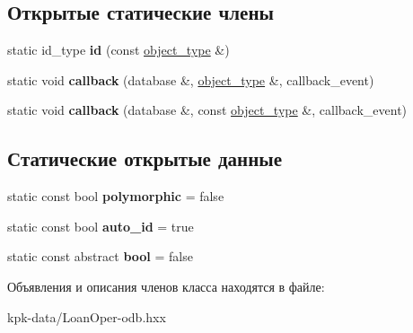 \subsection*{Открытые статические члены}
\begin{DoxyCompactItemize}
\item 
static id\+\_\+type {\bfseries id} (const \hyperlink{classkpk_1_1data_1_1_loan_oper}{object\+\_\+type} \&)\hypertarget{classodb_1_1access_1_1object__traits_3_01_1_1kpk_1_1data_1_1_loan_oper_01_4_a74978df585d0439b087c99bee90d77a3}{}\label{classodb_1_1access_1_1object__traits_3_01_1_1kpk_1_1data_1_1_loan_oper_01_4_a74978df585d0439b087c99bee90d77a3}

\item 
static void {\bfseries callback} (database \&, \hyperlink{classkpk_1_1data_1_1_loan_oper}{object\+\_\+type} \&, callback\+\_\+event)\hypertarget{classodb_1_1access_1_1object__traits_3_01_1_1kpk_1_1data_1_1_loan_oper_01_4_ac09fa22eac3b4ea186a24aca23d68391}{}\label{classodb_1_1access_1_1object__traits_3_01_1_1kpk_1_1data_1_1_loan_oper_01_4_ac09fa22eac3b4ea186a24aca23d68391}

\item 
static void {\bfseries callback} (database \&, const \hyperlink{classkpk_1_1data_1_1_loan_oper}{object\+\_\+type} \&, callback\+\_\+event)\hypertarget{classodb_1_1access_1_1object__traits_3_01_1_1kpk_1_1data_1_1_loan_oper_01_4_afff5db5a1b10413fd5d7a792573d3d17}{}\label{classodb_1_1access_1_1object__traits_3_01_1_1kpk_1_1data_1_1_loan_oper_01_4_afff5db5a1b10413fd5d7a792573d3d17}

\end{DoxyCompactItemize}
\subsection*{Статические открытые данные}
\begin{DoxyCompactItemize}
\item 
static const bool {\bfseries polymorphic} = false\hypertarget{classodb_1_1access_1_1object__traits_3_01_1_1kpk_1_1data_1_1_loan_oper_01_4_af2d7fefcd108bba127462450782b2d04}{}\label{classodb_1_1access_1_1object__traits_3_01_1_1kpk_1_1data_1_1_loan_oper_01_4_af2d7fefcd108bba127462450782b2d04}

\item 
static const bool {\bfseries auto\+\_\+id} = true\hypertarget{classodb_1_1access_1_1object__traits_3_01_1_1kpk_1_1data_1_1_loan_oper_01_4_ab2d59a932459d5debad5efd34499f993}{}\label{classodb_1_1access_1_1object__traits_3_01_1_1kpk_1_1data_1_1_loan_oper_01_4_ab2d59a932459d5debad5efd34499f993}

\item 
static const abstract {\bfseries bool} = false\hypertarget{classodb_1_1access_1_1object__traits_3_01_1_1kpk_1_1data_1_1_loan_oper_01_4_a6e174b08effc316e1a24a229d4ea32c8}{}\label{classodb_1_1access_1_1object__traits_3_01_1_1kpk_1_1data_1_1_loan_oper_01_4_a6e174b08effc316e1a24a229d4ea32c8}

\end{DoxyCompactItemize}


Объявления и описания членов класса находятся в файле\+:\begin{DoxyCompactItemize}
\item 
kpk-\/data/Loan\+Oper-\/odb.\+hxx\end{DoxyCompactItemize}
